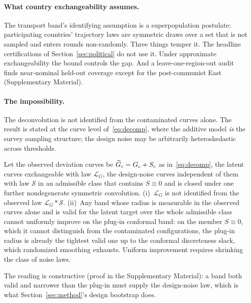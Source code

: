 \paragraph{What country exchangeability assumes.} The transport band's
identifying assumption is a superpopulation postulate: participating
countries' trajectory laws are symmetric draws over a set that is not
sampled and enters rounds non-randomly. Three things temper it. The
headline certifications of Section~\ref{sec:political} do not use it. Under
approximate exchangeability the \citet{barber2023conformal} bound controls
the gap. And a leave-one-region-out audit finds near-nominal held-out
coverage except for the post-communist East (Supplementary Material).

\paragraph{The impossibility.} The deconvolution is not identified from the
contaminated curves alone. The result is stated at the curve level
of~\eqref{eq:decomp}, where the additive model \emph{is} the survey
sampling structure; the design noise may be arbitrarily heteroskedastic
across thresholds.

\begin{theorem}
\label{thm:impossible}
Let the observed deviation curves be $\widetilde{G}_c = G_c + S_c$ as
in~\eqref{eq:decomp}, the latent curves exchangeable with law $\mathcal L_G$,
the design-noise curves independent of them with law $\mathcal S$ in an
admissible class that contains $S\equiv0$ and is closed under one further
nondegenerate symmetric convolution. (i)~$\mathcal L_G$ is not identified from
the observed law $\mathcal L_G*\mathcal S$. (ii)~Any band whose radius is
measurable in the observed curves alone and is valid for the latent target
over the whole admissible class cannot uniformly improve on the plug-in
conformal band: on the member $S\equiv0$, which it cannot distinguish from the
contaminated configurations, the plug-in radius is already the tightest valid
one up to the conformal discreteness slack, which randomized smoothing
exhausts. Uniform improvement requires shrinking the class of noise laws.
\end{theorem}

The reading is constructive (proof in the Supplementary Material): a band
both valid and narrower than the plug-in must supply the design-noise law,
which is what Section~\ref{sec:method}'s design bootstrap does.

